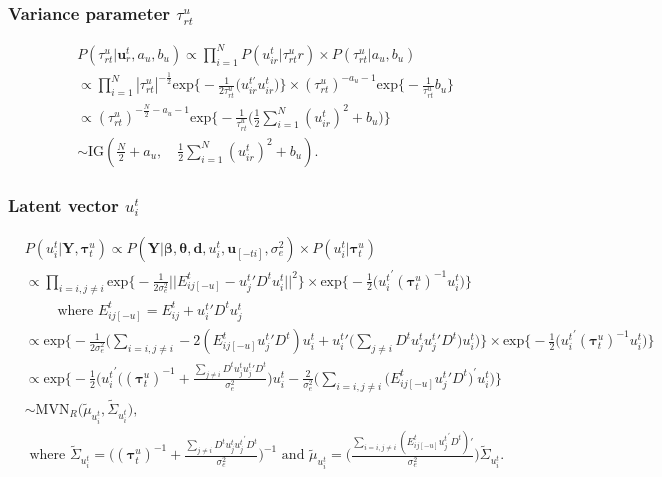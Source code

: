 \documentclass[a4paper]{article}
\begin{document}
\subsubsection{Variance parameter $\tau^u_{rt}$}
	\begin{equation}
	\begin{aligned}
	&P(\tau^u_{rt}|\boldsymbol{u}^t_r, a_u, b_u) \propto \prod_{i = 1}^N P(u^t_{ir}|\tau^u_{rt}r) \times P(\tau^u_{rt}|a_u, b_u) \\
	&\propto\prod_{i = 1}^N |\tau^u_{rt}|^{-\frac{1}{2}}\mbox{exp}\Big\{-\frac{1}{2\tau^u_{rt}}\big(u^{t\prime}_{ir}u^t_{ir}\big)\Big\}\times (\tau^u_{rt})^{-a_u-1}\mbox{exp}\Big\{-\frac{1}{\tau^u_{rt}}b_u\Big\}\\
	&\propto(\tau^u_{rt})^{-\frac{N}{2}-a_u-1}\mbox{exp}\Big\{-\frac{1}{\tau^u_{rt}}\Big(\frac{1}{2}\sum_{i = 1}^N ({u^t_{ir}})^2+b_u\Big)\Big\}\\
	&\sim \mbox{IG}(\frac{N}{2}+a_u,\quad \frac{1}{2}\sum_{i = 1}^N ({u^t_{ir}})^2+b_u).
	\end{aligned}
	\end{equation}
	\subsubsection{Latent vector $u_i^t$}
	\begin{equation}
	\begin{aligned}
	&P(u_i^t|\mathbf{Y}, \boldsymbol{\tau}_t^u) \propto P(\mathbf{Y}| \boldsymbol{\beta}, \boldsymbol{\theta}, \boldsymbol{d}, u_i^t, \boldsymbol{u}_{[-ti]},\sigma_e^2) \times P(u_i^t| \boldsymbol{\tau}_t^u) \\
	&\propto\prod\limits_{i=i, j\neq i}\mbox{exp}\Big\{-\frac{1}{2\sigma_e^2}||E^{t}_{ij[-u]}-{u^t_{j}}'D^tu^t_{i}||^2\Big\}\times \mbox{exp}\Big\{-\frac{1}{2}\big({u_i^t}^\prime(\boldsymbol{\tau}_t^u)^{-1}u_i^t\big)\Big\}\\
	&\quad\quad\mbox{ where } E^t_{ij[-u]}=E^t_{ij}+{u^t_{i}}'D^tu^t_{j}\\
	&\propto\mbox{exp}\Big\{-\frac{1}{2\sigma_e^2}\Big(\sum\limits_{i=i, j\neq i}-2(E^{t}_{ij[-u]}{u^t_{j}}'D^t)u^t_i+{u^t_i}'\big(\sum\limits_{j\neq i}D^tu^t_{j}{u^t_{j}}'D^t\big)u^t_i\Big)\Big\}\times \mbox{exp}\Big\{-\frac{1}{2}\big({u_i^t}^\prime(\boldsymbol{\tau}_t^u)^{-1}u_i^t\big)\Big\}\\
	&\propto\mbox{exp}\Big\{-\frac{1}{2}\Big({u_i^t}^\prime\big((\boldsymbol{\tau}_t^u)^{-1}+\frac{\sum_{j\neq i}D^tu^t_{j}{u^t_{j}}'D^t}{\sigma_e^2}\big)u^t_i-\frac{2}{\sigma_e^2}\big(\sum_{i=i, j\neq i}(E^{t}_{ij[-u]}{u^t_{j}}'D^t\big)^\prime u^t_i\Big)\Big\}\\
	& \sim \mbox{MVN}_R\big(\tilde{\mu}_{u^t_{i}}, \tilde{\Sigma}_{u^t_{i}} \big),
	\\
	& \mbox{ where }
	\tilde{\Sigma}_{u^t_{i}} = \Big((\boldsymbol{\tau}^u_t)^{-1}+\frac{\sum_{j\neq i}D^tu^t_{j}{u^t_{j}}^\prime D^t}{\sigma_e^2}\Big)^{-1}\mbox{ and } \tilde{\mu}_{u^t_{i}} = \Big(\frac{\sum_{i=i, j\neq i}(E^{t}_{ij[-u]}{u^t_{j}}^\prime D^t)'}{{\sigma_e^2}}\Big)\tilde{\Sigma}_{u^t_{i}}.
	\end{aligned}
	\end{equation} 
\end{document}
